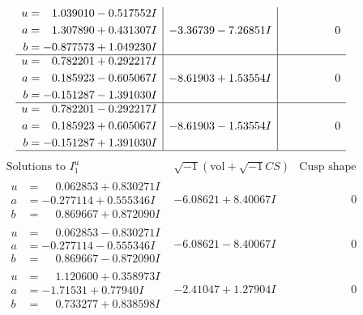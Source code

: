 \documentclass[1p]{elsarticle_modified}
\theoremstyle{definition}
\newcommand{\I}{\sqrt{-1}}
\begin{document}
$$\begin{array}{c|c|c}
\begin{aligned}
u &= \phantom{-}1.039010 - 0.517552 I \\
a &= \phantom{-}1.307890 + 0.431307 I \\
b &= -0.877573 + 1.049230 I\end{aligned}
 & -3.36739 - 7.26851 I & \phantom{-0.000000 } 0 \\ \hline\begin{aligned}
u &= \phantom{-}0.782201 + 0.292217 I \\
a &= \phantom{-}0.185923 - 0.605067 I \\
b &= -0.151287 - 1.391030 I\end{aligned}
 & -8.61903 + 1.53554 I & \phantom{-0.000000 } 0 \\ \hline\begin{aligned}
u &= \phantom{-}0.782201 - 0.292217 I \\
a &= \phantom{-}0.185923 + 0.605067 I \\
b &= -0.151287 + 1.391030 I\end{aligned}
 & -8.61903 - 1.53554 I & \phantom{-0.000000 } 0\\
 \hline 
 \end{array}$$\newpage$$\begin{array}{c|c|c}  
\text{Solutions to }I^u_{1}& \I (\text{vol} + \sqrt{-1}CS) & \text{Cusp shape}\\
 \hline 
\begin{aligned}
u &= \phantom{-}0.062853 + 0.830271 I \\
a &= -0.277114 + 0.555346 I \\
b &= \phantom{-}0.869667 + 0.872090 I\end{aligned}
 & -6.08621 + 8.40067 I & \phantom{-0.000000 } 0 \\ \hline\begin{aligned}
u &= \phantom{-}0.062853 - 0.830271 I \\
a &= -0.277114 - 0.555346 I \\
b &= \phantom{-}0.869667 - 0.872090 I\end{aligned}
 & -6.08621 - 8.40067 I & \phantom{-0.000000 } 0 \\ \hline\begin{aligned}
u &= \phantom{-}1.120600 + 0.358973 I \\
a &= -1.71531 + 0.77940 I \\
b &= \phantom{-}0.733277 + 0.838598 I\end{aligned}
 & -2.41047 + 1.27904 I & \phantom{-0.000000 } 0 \\ \hline\begin{aligned}

\end{aligned}
\end{array}$$
\end{document}
